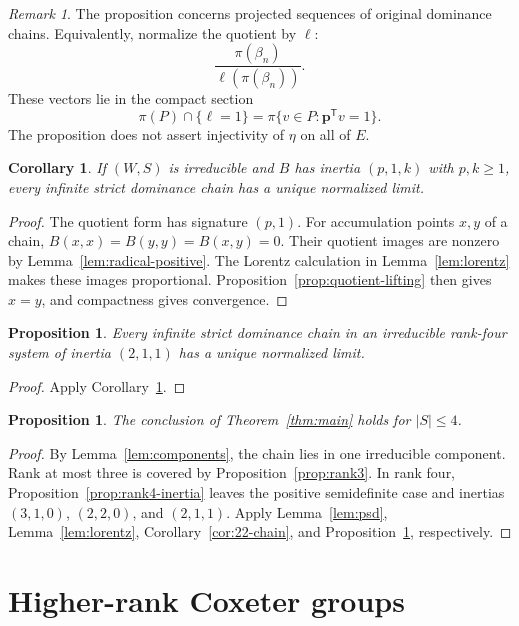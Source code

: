 \documentclass[11pt,reqno]{amsart}
\theoremstyle{plain}
\newtheorem{proposition}[theorem]{Proposition}
\newtheorem{corollary}[theorem]{Corollary}
\theoremstyle{definition}
\theoremstyle{remark}
\newtheorem{remark}[theorem]{Remark}
\numberwithin{equation}{section}
\begin{document}
\begin{remark}
The proposition concerns projected sequences of original dominance chains. Equivalently, normalize the quotient by $\ell$:
\[
\frac{\pi(\beta_n)}{\ell(\pi(\beta_n))}.
\]
These vectors lie in the compact section
\[
\pi(P)\cap\{\ell=1\}=\pi\{v\in P:\mathbf p^{\mathsf T}v=1\}.
\]
The proposition does not assert injectivity of $\eta$ on all of $E$.
\end{remark}

\begin{corollary}\label{cor:lorentz-quotient}
If $(W,S)$ is irreducible and $B$ has inertia $(p,1,k)$ with $p,k\geq1$, every infinite strict dominance chain has a unique normalized limit.
\end{corollary}
\begin{proof}
The quotient form has signature $(p,1)$. For accumulation points $x,y$ of a chain, $B(x,x)=B(y,y)=B(x,y)=0$. Their quotient images are nonzero by Lemma~\ref{lem:radical-positive}. The Lorentz calculation in Lemma~\ref{lem:lorentz} makes these images proportional. Proposition~\ref{prop:quotient-lifting} then gives $x=y$, and compactness gives convergence.
\end{proof}

\begin{proposition}\label{prop:degenerate}
Every infinite strict dominance chain in an irreducible rank-four system of inertia $(2,1,1)$ has a unique normalized limit.
\end{proposition}
\begin{proof}
Apply Corollary~\ref{cor:lorentz-quotient}.
\end{proof}

\begin{proposition}\label{prop:rank-at-most-four}
The conclusion of Theorem~\ref{thm:main} holds for $|S|\leq4$.
\end{proposition}
\begin{proof}
By Lemma~\ref{lem:components}, the chain lies in one irreducible component. Rank at most three is covered by Proposition~\ref{prop:rank3}. In rank four, Proposition~\ref{prop:rank4-inertia} leaves the positive semidefinite case and inertias $(3,1,0)$, $(2,2,0)$, and $(2,1,1)$. Apply Lemma~\ref{lem:psd}, Lemma~\ref{lem:lorentz}, Corollary~\ref{cor:22-chain}, and Proposition~\ref{prop:degenerate}, respectively.
\end{proof}

\clearpage
\section{Higher-rank Coxeter groups}
\label{sec:higher-rank}
\end{document}

